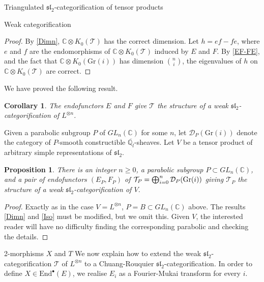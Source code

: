 \documentclass[12pt]{amsart}
\newtheorem{cor}[thm]{Corollary}
\newtheorem{prpn}[thm]{Proposition}
\theoremstyle{definition}
\theoremstyle{remark}
\theoremstyle{remark}
\begin{document}
\begin{section}{Triangulated $\mathfrak{sl}_{2}$-categorification of tensor products}
\begin{subsection}{Weak categorification}
\begin{proof} By \ref{Dimn}, $\mathbb{C} \otimes K_{0}(\mathcal{T})$ has the correct dimension. Let $h = ef -fe$, where $e$ and $f$ are the endomorphisms of $\mathbb{C} \otimes K_{0}(\mathcal{T})$ induced by $E$ and $F$. By \ref{EF-FE}, and the fact that $\mathbb{C} \otimes K_{0}(\text{Gr}(i))$ has dimension $\binom{n}{i}$, the eigenvalues of $h$ on $\mathbb{C} \otimes K_{0}(\mathcal{T})$ are correct.  \end{proof}

We have proved the following result.

\begin{cor} \label{WkCatStand} The endofunctors $E$ and $F$ give $\mathcal{T}$ the structure of a weak $\mathfrak{sl}_{2}$-categorification of $L^{\otimes n}$. \end{cor}

Given a parabolic subgroup $P$ of $GL_{n}(\mathbb{C})$ for some $n$, let $\mathcal{D}_{P}(\text{Gr}(i))$ denote the category of $P$-smooth constructible $\overline{\mathbb{Q}_{l}}$-sheaves. Let $V$ be a tensor product of arbitrary simple representations of $\mathfrak{sl}_{2}$.  
 
\begin{prpn} \label{ResultWkCat} There is an integer $n \geq 0$, a parabolic subgroup $P \subset GL_{n}(\mathbb{C})$, and a pair of endofunctors $(E_{P},F_{P})$ of $\mathcal{T}_{P} = \bigoplus_{i=0}^{n} \mathcal{D}_{P}({\rm Gr}(i))$ giving $\mathcal{T}_{P}$ the structure of a weak $\mathfrak{sl}_{2}$-categorification of $V$. \end{prpn} 

\begin{proof} Exactly as in the case $V = L^{\otimes n}$, $P = B \subset GL_{n}(\mathbb{C})$  above. The results \ref{Dimn} and \ref{Iso} must be modified, but we omit this. Given $V$, the interested reader will have no difficulty finding the corresponding parabolic and checking the details. \end{proof}

\end{subsection}

\begin{subsection}{2-morphisms $X$ and $T$} \label{2-morphs} We now explain how to extend the weak $\mathfrak{sl}_{2}$-categorification $\mathcal{T}$ of $L^{\otimes n}$ to a Chuang-Rouquier $\mathfrak{sl}_{2}$-categorification. In order to define $X \in \text{End}^{\bullet}(E)$, we realise $E_{i}$ as a Fourier-Mukai transform for every $i$. 


\end{subsection}
\end{section}
\end{document}
